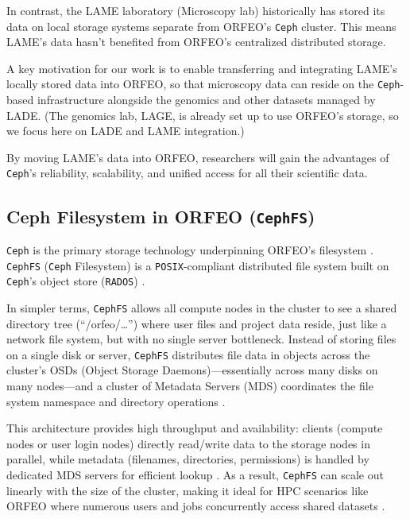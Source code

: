 In contrast, the LAME laboratory (Microscopy lab) historically has stored its 
data on local storage systems separate from ORFEO’s \texttt{Ceph} cluster. This 
means LAME’s data hasn’t benefited from ORFEO’s centralized distributed storage. 

\medskip

A key motivation for our work is to enable transferring and integrating LAME’s 
locally stored data into ORFEO, so that microscopy data can reside on the 
\texttt{Ceph}-based infrastructure alongside the genomics and other datasets 
managed by LADE. (The genomics lab, LAGE, is already set up to use ORFEO’s 
storage, so we focus here on LADE and LAME integration.) 

By moving LAME’s data into ORFEO, researchers will gain the advantages of 
\texttt{Ceph}’s reliability, scalability, and unified access for all their 
scientific data.


\subsection{Ceph Filesystem in ORFEO (\texttt{CephFS})}

\texttt{Ceph} is the primary storage technology underpinning ORFEO’s 
filesystem \parencite{ORFEO_Docs_Storage}. \texttt{CephFS} (\texttt{Ceph} 
Filesystem) is a \texttt{POSIX}-compliant distributed file system built on 
\texttt{Ceph}’s object store (\texttt{RADOS}) \parencite{CephFS}. 

In simpler terms, \texttt{CephFS} allows all compute nodes in the cluster to 
see a shared directory tree (“/orfeo/\ldots”) where user files and project data 
reside, just like a network file system, but with no single server bottleneck. 
Instead of storing files on a single disk or server, \texttt{CephFS} distributes 
file data in objects across the cluster’s OSDs (Object Storage Daemons)—essentially 
across many disks on many nodes—and a cluster of Metadata Servers (MDS) 
coordinates the file system namespace and directory 
operations \parencite{CephFS,Ceph_RADOS,RedHat_CephFS}. 

This architecture provides high throughput and availability: clients (compute 
nodes or user login nodes) directly read/write data to the storage nodes in 
parallel, while metadata (filenames, directories, permissions) is handled by 
dedicated MDS servers for efficient lookup \parencite{CephFS,RedHat_CephFS}. As a 
result, \texttt{CephFS} can scale out linearly with the size of the cluster, 
making it ideal for HPC scenarios like ORFEO where numerous users and jobs 
concurrently access shared datasets \parencite{CephFS}.

